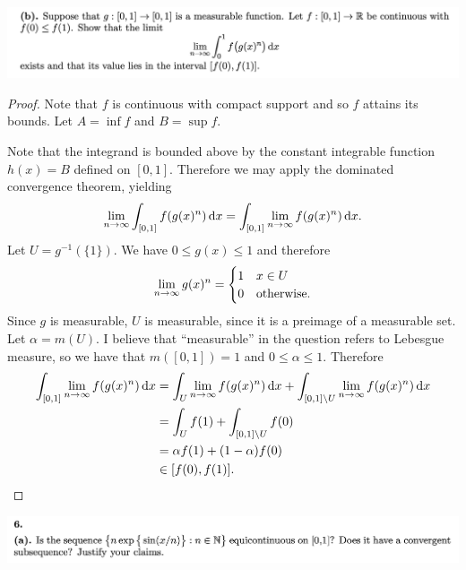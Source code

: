 \begin{mdframed}
\includegraphics[width=400pt]{img/analysis--berkeley-202a-final-cd70.png}
\end{mdframed}

\begin{proof}

  Note that $f$ is continuous with compact support and so $f$ attains its bounds. Let $A = \inf f$
  and $B = \sup f$.

  Note that the integrand is bounded above by the constant integrable function $h(x) = B$ defined on $[0, 1]$.
  Therefore we may apply the dominated convergence theorem, yielding
  \begin{align*}
    \limninf \int_{[0, 1]} f(g(x)^n) \dx = \int_{[0, 1]} \limninf  f(g(x)^n) \dx.
  \end{align*}
  Let $U = g^{-1}(\{1\})$. We have $0 \leq g(x) \leq 1$ and therefore
  \begin{align*}
    \limninf g(x)^n =
    \begin{cases}
      1 & x \in U \\
      0 & \text{otherwise}.
    \end{cases}
  \end{align*}
  Since $g$ is measurable, $U$ is measurable, since it is a preimage of a measurable set. Let $\alpha = m(U)$.
  I believe that ``measurable​'' in the question refers to Lebesgue measure, so we have that $m([0, 1]) = 1$
  and $0 \leq \alpha \leq 1$. Therefore
  \begin{align*}
    \int_{[0, 1]} \limninf  f(g(x)^n) \dx
    &= \int_U \limninf  f(g(x)^n) \dx + \int_{[0, 1] \setminus U} \limninf  f(g(x)^n) \dx \\
    &= \int_U f(1) + \int_{[0, 1] \setminus U} f(0) \\
    &= \alpha f(1) + (1 - \alpha) f(0) \\
    &\in [f(0), f(1)].
  \end{align*}
\end{proof}


\newpage
\begin{mdframed}
\includegraphics[width=400pt]{img/analysis--berkeley-202a-final-f5b6.png}
\end{mdframed}

